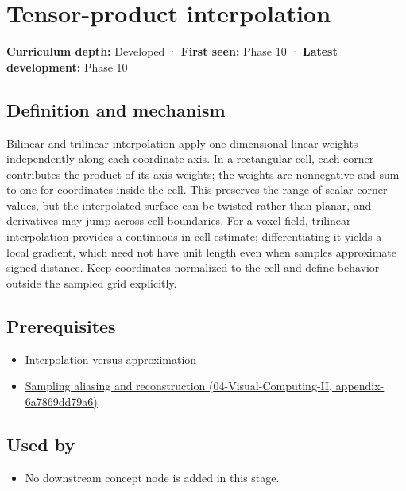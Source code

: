 \hypertarget{appendix-0a09b6dfdc86}{}
\section{Tensor-product interpolation}\label{appendix-0a09b6dfdc86-tensor-product-interpolation}

\textbf{Curriculum depth:} Developed · \textbf{First seen:} Phase 10 · \textbf{Latest development:} Phase 10

\subsection{Definition and mechanism}\label{appendix-0a09b6dfdc86-definition-and-mechanism}

Bilinear and trilinear interpolation apply one-dimensional linear weights independently along each coordinate axis. In a rectangular cell, each corner contributes the product of its axis weights; the weights are nonnegative and sum to one for coordinates inside the cell. This preserves the range of scalar corner values, but the interpolated surface can be twisted rather than planar, and derivatives may jump across cell boundaries. For a voxel field, trilinear interpolation provides a continuous in-cell estimate; differentiating it yields a local gradient, which need not have unit length even when samples approximate signed distance. Keep coordinates normalized to the cell and define behavior outside the sampled grid explicitly.

\subsection{Prerequisites}\label{appendix-0a09b6dfdc86-prerequisites}

\begin{itemize}
\tightlist
\item
  \hyperref[appendix-0c2a5f69851e]{Interpolation versus approximation}
\item
  \href{../04-Visual-Computing-II/main.pdf\#nameddest=appendix-6a7869dd79a6}{Sampling aliasing and reconstruction (04-Visual-Computing-II, appendix-6a7869dd79a6)}
\end{itemize}

\subsection{Used by}\label{appendix-0a09b6dfdc86-used-by}

\begin{itemize}
\tightlist
\item
  No downstream concept node is added in this stage.
\end{itemize}

